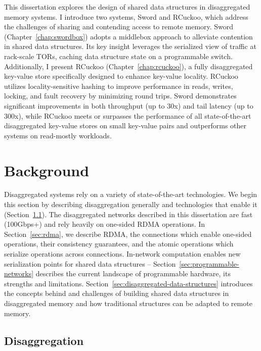 \documentclass[12pt]{ucsddissertation}
\begin{document}
\begin{dissertationintroduction}
This dissertation explores the design of shared data structures in disaggregated memory systems. I
introduce two systems, Sword and RCuckoo, which address the challenges of sharing and contending
access to remote memory. Sword (Chapter~\ref{chap:swordbox}) adopts a middlebox approach to alleviate
contention in shared data structures. Its key insight leverages the serialized view of traffic at
rack-scale TORs, caching data structure state on a programmable switch. Additionally, I present
RCuckoo (Chapter~\ref{chap:rcuckoo}), a fully disaggregated key-value store specifically designed to
enhance key-value locality. RCuckoo utilizes locality-sensitive hashing to improve performance in
reads, writes, locking, and fault recovery by minimizing round trips. Sword demonstrates significant
improvements in both throughput (up to 30x) and tail latency (up to 300x), while RCuckoo meets or
surpasses the performance of all state-of-the-art disaggregated key-value stores on small key-value
pairs and outperforms other systems on read-mostly workloads.

\end{dissertationintroduction}

\chapter{Background}


Disaggregated systems rely on a variety of state-of-the-art technologies. We begin this section by
describing disaggregation generally and technologies that enable it (Section~\ref{sec:disaggregation}). The
disaggregated networks described in this dissertation are fast (100Gbps+) and rely heavily on
one-sided RDMA operations. In Section~\ref{sec:rdma}, we describe RDMA, the connections which enable
one-sided operations, their consistency guarantees, and the atomic operations which serialize
operations across connections. In-network computation enables new serialization points for shared
data structures -- Section~\ref{sec:programmable-networks} describes the current landscape of
programmable hardware, its strengths and limitations.
Section~\ref{sec:disaggregated-data-structures} introduces the concepts behind and challenges of
building shared data structures in disaggregated memory and how traditional structures can be
adapted to remote memory.


\section{Disaggregation}
\label{sec:disaggregation}
\end{document}
